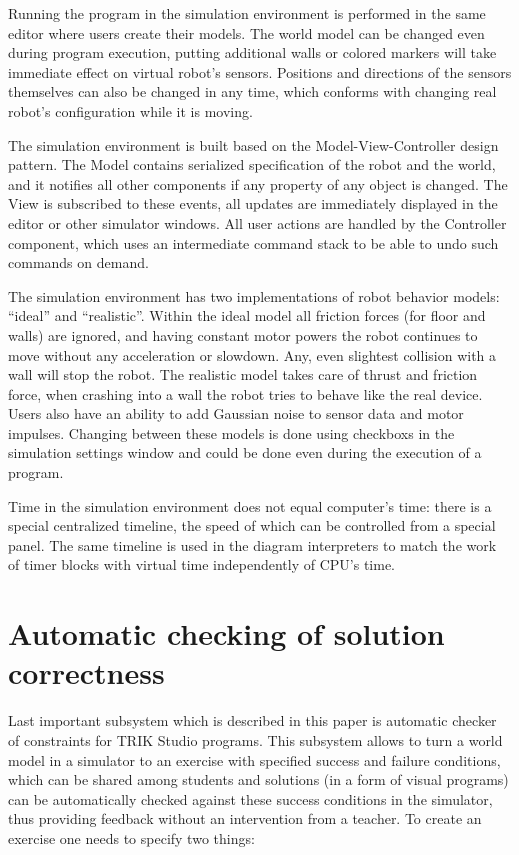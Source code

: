 \documentclass[conference]{IEEEtran}
\begin{document}
Running the program in the simulation environment is performed in the same editor where users create their models. The world model can be changed even during program execution, putting additional walls or colored markers will take immediate effect on virtual robot's sensors. Positions and directions of the sensors themselves can also be changed in any time, which conforms with changing real robot's configuration while it is moving.

The simulation environment is built based on the Model-View-Controller design pattern. The Model contains serialized specification of the robot and the world, and it notifies all other components if any property of any object is changed. The View is subscribed to these events, all updates are immediately displayed in the editor or other simulator windows. All user actions are handled by the Controller component, which uses an intermediate command stack to be able to undo such commands on demand.

The simulation environment has two implementations of robot behavior models: ``ideal'' and ``realistic''. Within the ideal model all friction forces (for floor and walls) are ignored, and having constant motor powers the robot continues to move without any acceleration or slowdown. Any, even slightest collision with a wall will stop the robot. The realistic model takes care of thrust and friction force, when crashing into a wall the robot tries to behave like the real device. Users also have an ability to add Gaussian noise to sensor data and motor impulses. Changing between these models is done using checkboxs in the simulation settings window and could be done even during the execution of a program. 

Time in the simulation environment does not equal computer's time: there is a special centralized timeline, the speed of which can be controlled from a special panel. The same timeline is used in the diagram interpreters to match the work of timer blocks with virtual time independently of CPU's time.

\section{Automatic checking of solution correctness}
\label{chapter:constraintsChecker}

Last important subsystem which is described in this paper is automatic checker of constraints for TRIK Studio programs. This subsystem allows to turn a world model in a simulator to an exercise with specified success and failure conditions, which can be shared among students and solutions (in a form of visual programs) can be automatically checked against these success conditions in the simulator, thus providing feedback without an intervention from a teacher. To create an exercise one needs to specify two things:
\end{document}
